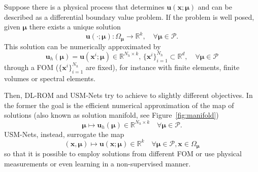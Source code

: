 \documentclass[11pt]{article}
\begin{document}
Suppose there is a physical process that determines $\mathbf u(\mathbf x; \boldsymbol \mu)$ and can be described as a differential boundary value problem. If the problem is well posed, given $\boldsymbol  \mu$ there exists a unique solution 
$$\mathbf u(\cdot; \boldsymbol \mu): \Omega_{\boldsymbol \mu} \rightarrow \mathbb R^k, \quad \forall \boldsymbol \mu \in \mathcal P.$$
This solution can be numerically approximated by 
$$\mathbf u_h(\boldsymbol \mu) = \mathbf u(\mathbf x^i; \boldsymbol \mu) \in \mathbb R^{N_h \times k}, \, \{\mathbf x^i\}_{i=1}^{N_h} \subset \mathbb R^d, \quad \forall \boldsymbol \mu \in \mathcal P$$
through a FOM ($\{\mathbf x^i\}_{i=1}^{N_h}$ are fixed), for instance with finite elements, finite volumes or spectral elements.

Then, DL-ROM and USM-Nets try to achieve to slightly different objectives. In the former the goal is the efficient numerical approximation of the map of solutions (also known as solution manifold, see Figure~\ref{fig:manifold})
$$\boldsymbol \mu \mapsto \mathbf u_h(\boldsymbol \mu) \in \mathbb R^{N_h \times k} \quad \forall \boldsymbol \mu \in \mathcal{P}.$$
USM-Nets, instead, surrogate the map 
$$(\mathbf x, \boldsymbol \mu) \mapsto \mathbf u(\mathbf x; \boldsymbol \mu) \in \mathbb R^{k}  \quad \forall \boldsymbol \mu \in \mathcal{P}, \mathbf x \in \Omega_{\boldsymbol \mu}$$
so that it is possible to employ solutions from different FOM or use physical measurements or even learning in a non-supervised manner.
\end{document}
